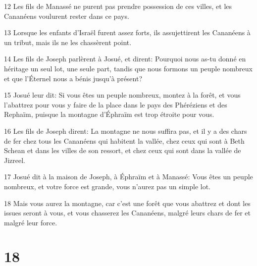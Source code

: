 \par 12 Les fils de Manassé ne purent pas prendre possession de ces villes, et les Cananéens voulurent rester dans ce pays.
\par 13 Lorsque les enfants d'Israël furent assez forts, ils assujettirent les Cananéens à un tribut, mais ils ne les chassèrent point.
\par 14 Les fils de Joseph parlèrent à Josué, et dirent: Pourquoi nous as-tu donné en héritage un seul lot, une seule part, tandis que nous formons un peuple nombreux et que l'Éternel nous a bénis jusqu'à présent?
\par 15 Josué leur dit: Si vous êtes un peuple nombreux, montez à la forêt, et vous l'abattrez pour vous y faire de la place dans le pays des Phéréziens et des Rephaïm, puisque la montagne d'Éphraïm est trop étroite pour vous.
\par 16 Les fils de Joseph dirent: La montagne ne nous suffira pas, et il y a des chars de fer chez tous les Cananéens qui habitent la vallée, chez ceux qui sont à Beth Schean et dans les villes de son ressort, et chez ceux qui sont dans la vallée de Jizreel.
\par 17 Josué dit à la maison de Joseph, à Éphraïm et à Manassé: Vous êtes un peuple nombreux, et votre force est grande, vous n'aurez pas un simple lot.
\par 18 Mais vous aurez la montagne, car c'est une forêt que vous abattrez et dont les issues seront à vous, et vous chasserez les Cananéens, malgré leurs chars de fer et malgré leur force.

\chapter{18}


